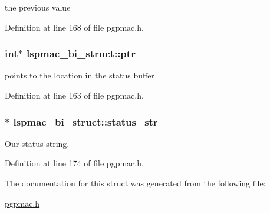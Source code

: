 the previous value 



Definition at line 168 of file pgpmac.\-h.

\hypertarget{structlspmac__bi__struct_ae201bf05130bcb6985704ea42efabeb3}{
\subsubsection[{ptr}]{\setlength{\rightskip}{0pt plus 5cm}int$\ast$ lspmac\-\_\-bi\-\_\-struct\-::ptr}}\label{structlspmac__bi__struct_ae201bf05130bcb6985704ea42efabeb3}


points to the location in the status buffer 



Definition at line 163 of file pgpmac.\-h.

\hypertarget{structlspmac__bi__struct_af934ce1b86836602a626c3d27627b66e}{
\subsubsection[{status\-\_\-str}]{$\ast$ lspmac\-\_\-bi\-\_\-struct\-::status\-\_\-str}}\label{structlspmac__bi__struct_af934ce1b86836602a626c3d27627b66e}


Our status string. 



Definition at line 174 of file pgpmac.\-h.



The documentation for this struct was generated from the following file\-:\begin{DoxyCompactItemize}
\item 
\hyperlink{pgpmac_8h}{pgpmac.\-h}\end{DoxyCompactItemize}
